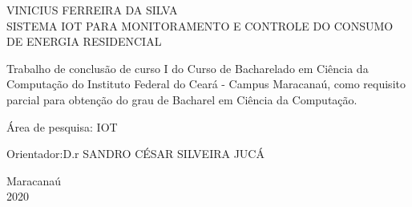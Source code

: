 \begin{titlepage}
\vfill
\begin{center}

    {\large VINICIUS FERREIRA DA SILVA\\}
    \vspace{2cm}
    {\Large \textsc{SISTEMA IOT PARA MONITORAMENTO E CONTROLE DO CONSUMO DE ENERGIA RESIDENCIAL}\\}
    \vspace{1cm}
    \hspace{.45\linewidth}
    \begin{minipage}{.50\linewidth}

            Trabalho de conclusão de curso I do Curso de Bacharelado em Ciência da Computação do Instituto Federal do Ceará - Campus Maracanaú, como requisito parcial para obtenção do grau de Bacharel em Ciência da Computação.

            \vspace{0.5 cm}

            Área de pesquisa: IOT

            \vspace{0.5 cm}

            Orientador:D.r SANDRO CÉSAR SILVEIRA JUCÁ
    
    \end{minipage}

    \vspace{2cm}
    \vfill
    {\large Maracanaú\\ 2020}
\end{center}

\end{titlepage}